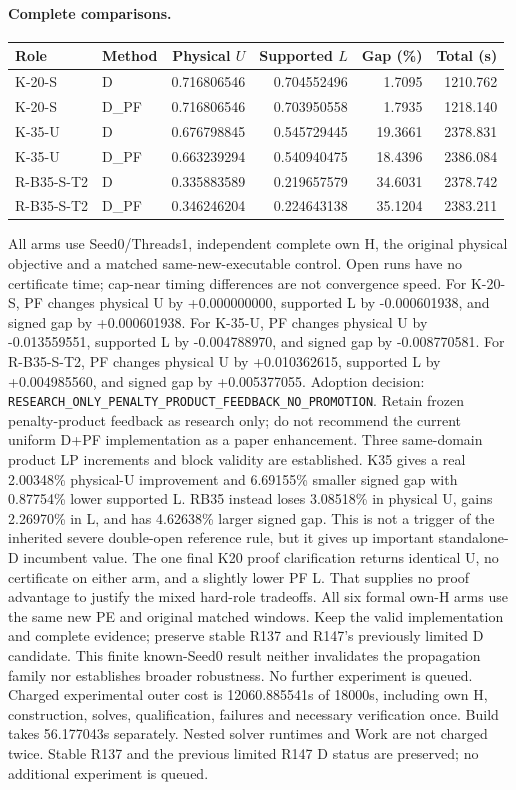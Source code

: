 \paragraph{Complete comparisons.}
\begin{center}\small\begin{tabular}{llrrrr}
Role & Method & Physical $U$ & Supported $L$ & Gap (\%) & Total (s) \\
\hline
K-20-S & D & 0.716806546 & 0.704552496 & 1.7095 & 1210.762 \\
K-20-S & D\_PF & 0.716806546 & 0.703950558 & 1.7935 & 1218.140 \\
K-35-U & D & 0.676798845 & 0.545729445 & 19.3661 & 2378.831 \\
K-35-U & D\_PF & 0.663239294 & 0.540940475 & 18.4396 & 2386.084 \\
R-B35-S-T2 & D & 0.335883589 & 0.219657579 & 34.6031 & 2378.742 \\
R-B35-S-T2 & D\_PF & 0.346246204 & 0.224643138 & 35.1204 & 2383.211 \\
\end{tabular}\end{center}
All arms use Seed0/Threads1, independent complete own H, the original physical objective and a matched same-new-executable control. Open runs have no certificate time; cap-near timing differences are not convergence speed.
For K-20-S, PF changes physical U by +0.000000000, supported L by -0.000601938, and signed gap by +0.000601938.
For K-35-U, PF changes physical U by -0.013559551, supported L by -0.004788970, and signed gap by -0.008770581.
For R-B35-S-T2, PF changes physical U by +0.010362615, supported L by +0.004985560, and signed gap by +0.005377055.
Adoption decision: \texttt{RESEARCH\_ONLY\_PENALTY\_PRODUCT\_FEEDBACK\_NO\_PROMOTION}.
Retain frozen penalty-product feedback as research only; do not recommend the current uniform D+PF implementation as a paper enhancement. Three same-domain product LP increments and block validity are established. K35 gives a real 2.00348\% physical-U improvement and 6.69155\% smaller signed gap with 0.87754\% lower supported L. RB35 instead loses 3.08518\% in physical U, gains 2.26970\% in L, and has 4.62638\% larger signed gap. This is not a trigger of the inherited severe double-open reference rule, but it gives up important standalone-D incumbent value. The one final K20 proof clarification returns identical U, no certificate on either arm, and a slightly lower PF L. That supplies no proof advantage to justify the mixed hard-role tradeoffs. All six formal own-H arms use the same new PE and original matched windows. Keep the valid implementation and complete evidence; preserve stable R137 and R147's previously limited D candidate. This finite known-Seed0 result neither invalidates the propagation family nor establishes broader robustness. No further experiment is queued.
Charged experimental outer cost is 12060.885541s of 18000s, including own H, construction, solves, qualification, failures and necessary verification once. Build takes 56.177043s separately. Nested solver runtimes and Work are not charged twice. Stable R137 and the previous limited R147 D status are preserved; no additional experiment is queued.
